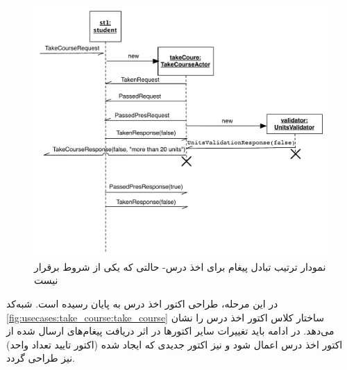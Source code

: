 \begin{figure}
    \begin{center}
	\includegraphics[width=14cm]{4-ProposedFramework/Figures/take_course_seq2.pdf}
    \end{center}
    \caption{\label{fig:take_course_sequence_2} نمودار ترتیب تبادل پیغام‌ برای اخذ درس- حالتی که یکی از شروط برقرار نیست }
\end{figure}


 در این مرحله، طراحی اکتور اخذ درس به پایان رسیده است. شبه‌کد \ref{fig:usecases:take_course:take_course} ساختار کلاس اکتور اخذ درس را نشان می‌دهد.
  در ادامه باید تغییرات سایر اکتورها در اثر دریافت پیغام‌های ارسال شده از اکتور اخذ درس اعمال شود و نیز اکتور جدیدی که ایجاد شده (اکتور تایید تعداد واحد) نیز طراحی گردد.
